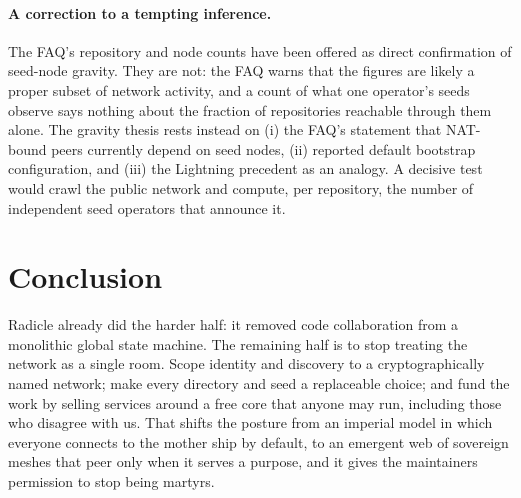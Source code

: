 \documentclass[a4paper,11pt,twoside,parskip=half-,headings=small]{scrartcl}
\begin{document}
\paragraph{A correction to a tempting inference.} The FAQ's repository and node counts have been offered as direct confirmation of seed-node gravity. They are not: the FAQ warns that the figures are likely a proper subset of network activity, and a count of what one operator's seeds observe says nothing about the fraction of repositories reachable through them alone. The gravity thesis rests instead on (i) the FAQ's statement that NAT-bound peers currently depend on seed nodes, (ii) reported default bootstrap configuration, and (iii) the Lightning precedent as an analogy. A decisive test would crawl the public network and compute, per repository, the number of independent seed operators that announce it.

\section{Conclusion}
Radicle already did the harder half: it removed code collaboration from a monolithic
global state machine. The remaining half is to stop treating the network as a single room. Scope identity and discovery to
a cryptographically named network; make every directory and seed a replaceable choice; and fund the work by selling
services around a free core that anyone may run, including those who disagree with us. That shifts the posture from an
imperial model in which everyone connects to the mother ship by default, to an emergent web of sovereign meshes that peer
only when it serves a purpose, and it gives the maintainers permission to stop being martyrs.
\end{document}
